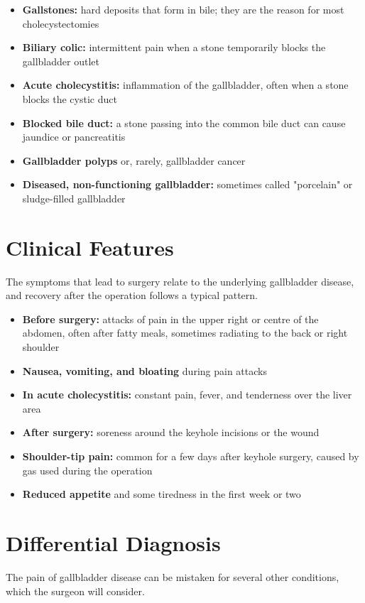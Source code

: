 \begin{itemize}
    \item \textbf{Gallstones:} hard deposits that form in bile; they are the reason for most cholecystectomies
    \item \textbf{Biliary colic:} intermittent pain when a stone temporarily blocks the gallbladder outlet
    \item \textbf{Acute cholecystitis:} inflammation of the gallbladder, often when a stone blocks the cystic duct
    \item \textbf{Blocked bile duct:} a stone passing into the common bile duct can cause jaundice or pancreatitis
    \item \textbf{Gallbladder polyps} or, rarely, gallbladder cancer
    \item \textbf{Diseased, non-functioning gallbladder:} sometimes called "porcelain" or sludge-filled gallbladder
\end{itemize}

\section*{Clinical Features}
The symptoms that lead to surgery relate to the underlying gallbladder disease, and recovery after the operation follows a typical pattern.

\begin{itemize}
    \item \textbf{Before surgery:} attacks of pain in the upper right or centre of the abdomen, often after fatty meals, sometimes radiating to the back or right shoulder
    \item \textbf{Nausea, vomiting, and bloating} during pain attacks
    \item \textbf{In acute cholecystitis:} constant pain, fever, and tenderness over the liver area
    \item \textbf{After surgery:} soreness around the keyhole incisions or the wound
    \item \textbf{Shoulder-tip pain:} common for a few days after keyhole surgery, caused by gas used during the operation
    \item \textbf{Reduced appetite} and some tiredness in the first week or two
\end{itemize}

\section*{Differential Diagnosis}
The pain of gallbladder disease can be mistaken for several other conditions, which the surgeon will consider.

